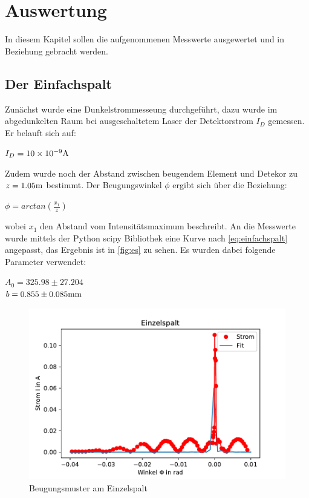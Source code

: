\section{Auswertung}
\label{sec:auswertung}
In diesem Kapitel sollen die aufgenommenen Messwerte ausgewertet und in Beziehung gebracht werden.

\subsection{Der Einfachspalt}
\label{sec:einfachspalt}
Zunächst wurde eine Dunkelstrommesseung durchgeführt, dazu wurde im abgedunkelten Raum bei ausgeschaltetem
Laser der Detektorstrom $I_D$ gemessen. Er belauft sich auf:
\begin{center}
    $I_D=10\times 10^{-9}\si[]{A}$
\end{center}
Zudem wurde noch der Abstand zwischen beugendem Element und Detekor zu $z=1.05\si[]{m}$ bestimmt.
Der Beugungswinkel $\phi$ ergibt sich über die Beziehung:
\begin{center}
    $\phi=arctan(\frac{x_1}{z})$
\end{center}
wobei $x_1$ den Abstand vom Intensitätsmaximum beschreibt.
An die Messwerte wurde mittels der Python scipy Bibliothek eine Kurve nach \autoref{eq:einfachspalt} 
angepasst, das Ergebnis ist in \autoref{fig:es} zu sehen. Es wurden dabei folgende Parameter verwendet:
\begin{center}
    $A_0=325.98\pm 27.204$\\
    $b=0.855\pm 0.085\si[]{mm}$
\end{center}
\begin{figure}
    \centering
    \includegraphics{Einzelspalt.pdf}
    \caption{Beugungsmuster am Einzelspalt}
    \label{fig:es}
  \end{figure}

